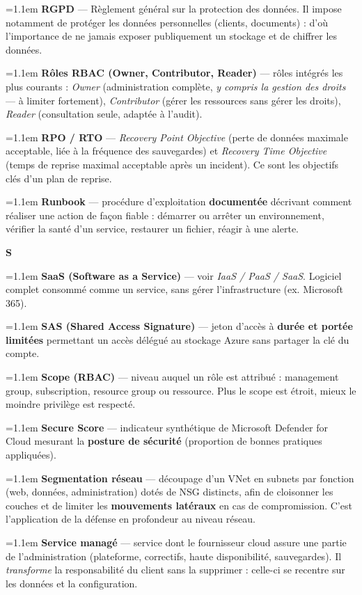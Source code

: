 \documentclass[11pt,a4paper]{article}
\newcommand{\lettre}[1]{%
  \par\addvspace{9pt}\needspace{4.5\baselineskip}%
  \markright{#1}%
  {\noindent\sffamily\bfseries\Large\color{azure}#1}%
  \nobreak\vspace{0.4mm}{\color{azure!45}\hrule height 1pt}\nobreak\vspace{3mm}\par}
\newcommand{\df}[2]{%
  \par\addvspace{4pt}\needspace{2\baselineskip}%
  \hangindent=1.1em\hangafter=1
  {\sffamily\bfseries\color{azuredark}#1} — #2\par}
\begin{document}
\df{RGPD}{Règlement général sur la protection des données. Il impose notamment de protéger les données personnelles (clients, documents) : d'où l'importance de ne jamais exposer publiquement un stockage et de chiffrer les données.}

\df{Rôles RBAC (Owner, Contributor, Reader)}{rôles intégrés les plus courants : \emph{Owner} (administration complète, \emph{y compris la gestion des droits} — à limiter fortement), \emph{Contributor} (gérer les ressources sans gérer les droits), \emph{Reader} (consultation seule, adaptée à l'audit).}

\df{RPO / RTO}{\emph{Recovery Point Objective} (perte de données maximale acceptable, liée à la fréquence des sauvegardes) et \emph{Recovery Time Objective} (temps de reprise maximal acceptable après un incident). Ce sont les objectifs clés d'un plan de reprise.}

\df{Runbook}{procédure d'exploitation \textbf{documentée} décrivant comment réaliser une action de façon fiable : démarrer ou arrêter un environnement, vérifier la santé d'un service, restaurer un fichier, réagir à une alerte.}

\lettre{S}

\df{SaaS (Software as a Service)}{voir \emph{IaaS / PaaS / SaaS}. Logiciel complet consommé comme un service, sans gérer l'infrastructure (ex. Microsoft 365).}

\df{SAS (Shared Access Signature)}{jeton d'accès à \textbf{durée et portée limitées} permettant un accès délégué au stockage Azure sans partager la clé du compte.}

\df{Scope (RBAC)}{niveau auquel un rôle est attribué : management group, subscription, resource group ou ressource. Plus le scope est étroit, mieux le moindre privilège est respecté.}

\df{Secure Score}{indicateur synthétique de Microsoft Defender for Cloud mesurant la \textbf{posture de sécurité} (proportion de bonnes pratiques appliquées).}

\df{Segmentation réseau}{découpage d'un VNet en subnets par fonction (web, données, administration) dotés de NSG distincts, afin de cloisonner les couches et de limiter les \textbf{mouvements latéraux} en cas de compromission. C'est l'application de la défense en profondeur au niveau réseau.}

\df{Service managé}{service dont le fournisseur cloud assure une partie de l'administration (plateforme, correctifs, haute disponibilité, sauvegardes). Il \emph{transforme} la responsabilité du client sans la supprimer : celle-ci se recentre sur les données et la configuration.}
\end{document}
